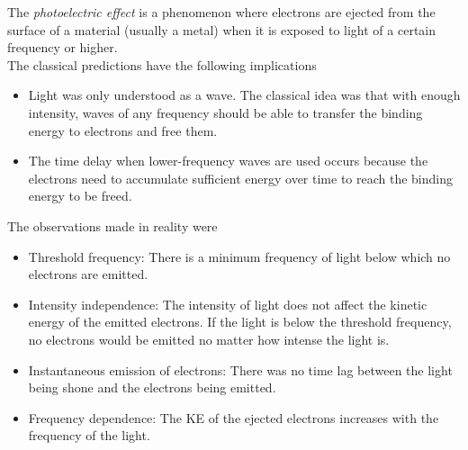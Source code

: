 \documentclass[a4paper,12pt]{article}
\newcommand{\lb}{\\[8pt]}
\begin{document}
The \textit{photoelectric effect} is a phenomenon where electrons are ejected from the surface of a material (usually a metal) when it is exposed to light of a certain frequency or higher.\lb
The classical predictions have the following implications
\begin{itemize}
  \item Light was only understood as a wave. The classical idea was that with enough intensity, waves of any frequency should be able to transfer the binding energy to electrons and free them.
  \item The time delay when lower-frequency waves are used occurs because the electrons need to accumulate sufficient energy over time to reach the binding energy to be freed.
\end{itemize}
The observations made in reality were
\begin{itemize}
  \item Threshold frequency: There is a minimum frequency of light below which no electrons are emitted.
  \item Intensity independence: The intensity of light does not affect the kinetic energy of the emitted electrons. If the light is below the threshold frequency, no electrons would be emitted no matter how intense the light is.
  \item Instantaneous emission of electrons: There was no time lag between the light being shone and the electrons being emitted.
  \item Frequency dependence: The KE of the ejected electrons increases with the frequency of the light.
\end{itemize}
\end{document}
